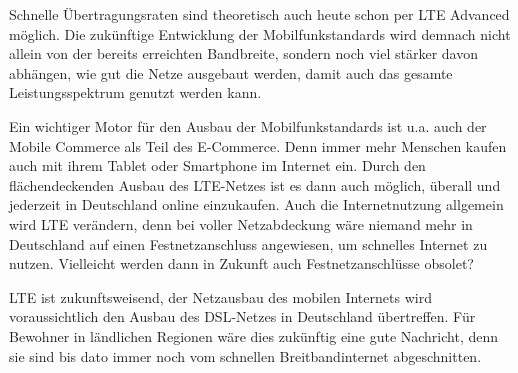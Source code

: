 \begin{multicols}{3}
Schnelle Übertragungsraten sind theoretisch auch heute schon per LTE Advanced möglich. Die zukünftige Entwicklung der Mobilfunkstandards wird demnach nicht allein von der bereits erreichten Bandbreite, sondern noch viel stärker davon abhängen, wie gut die Netze ausgebaut werden, damit auch das gesamte Leistungsspektrum genutzt werden kann.

Ein wichtiger Motor für den Ausbau der Mobilfunkstandards ist u.a. auch der Mobile Commerce als Teil des E-Commerce. Denn immer mehr Menschen kaufen auch mit ihrem Tablet oder Smartphone im Internet ein. Durch den flächendeckenden Ausbau des LTE-Netzes ist es dann auch möglich, überall und jederzeit in Deutschland online einzukaufen. Auch die Internetnutzung allgemein wird LTE verändern, denn bei voller Netzabdeckung wäre niemand mehr in Deutschland auf einen Festnetzanschluss angewiesen, um schnelles Internet zu nutzen. Vielleicht werden dann in Zukunft auch Festnetzanschlüsse obsolet?

LTE ist zukunftsweisend, der Netzausbau des mobilen Internets wird voraussichtlich den Ausbau des DSL-Netzes in Deutschland übertreffen. Für Bewohner in ländlichen Regionen wäre dies zukünftig eine gute Nachricht, denn sie sind bis dato immer noch vom schnellen Breitbandinternet abgeschnitten.


\printbibliography[segment=5,heading=subbibliography]
\end{multicols}
\newpage
